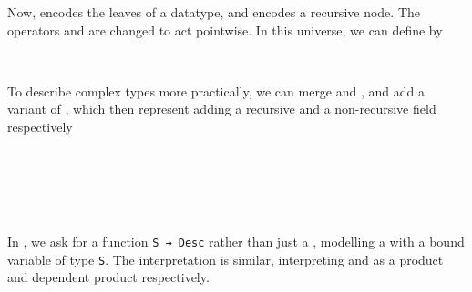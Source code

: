 Now,  encodes the leaves of a datatype, and  encodes a recursive node. The operators  and  are changed to act pointwise. %
In this universe, we can define  by
\begin{code}%
%
\>[2]%
\>[6]\AgdaSymbol{:}\AgdaSpace{}%
\<%
\\
%
\>[2]%
\>[6]\AgdaSymbol{=}\AgdaSpace{}%
\AgdaSpace{}%
\AgdaSpace{}%
\<%
\end{code}
To describe complex types more practically, we can merge  and , and add a variant  of , which then represent adding a recursive and a non-recursive field respectively
\begin{code}[hide]%
\>[0]\AgdaSpace{}%
\AgdaSpace{}%
\<%
\end{code}
\begin{code}%
\>[0][@{}l@{\AgdaIndent{1}}]%
\>[2]\AgdaSpace{}%
\AgdaSpace{}%
\AgdaSymbol{:}\AgdaSpace{}%
\AgdaSpace{}%
\<%
\\
\>[2][@{}l@{\AgdaIndent{0}}]%
\>[4]%
\>[9]\AgdaSymbol{:}\AgdaSpace{}%
\<%
\\
%
\>[4]%
\>[9]\AgdaSymbol{:}\AgdaSpace{}%
\AgdaSpace{}%
\AgdaSpace{}%
\<%
\\
%
\>[4]%
\>[9]\AgdaSymbol{:}\AgdaSpace{}%
\AgdaSymbol{(}\AgdaSpace{}%
\AgdaSymbol{:}\AgdaSpace{}%
\AgdaSymbol{)}\AgdaSpace{}%
\AgdaSpace{}%
\AgdaSymbol{(}\AgdaSpace{}%
\AgdaSpace{}%
\AgdaSymbol{)}\AgdaSpace{}%
\AgdaSpace{}%
\<%
\\
%
\>[4]%
\>[9]\AgdaSymbol{:}\AgdaSpace{}%
\AgdaSpace{}%
\AgdaSpace{}%
\AgdaSpace{}%
\AgdaSpace{}%
\<%
\end{code}
In , we ask for a function \texttt{S → Desc} rather than just a , modelling a  with a bound variable of type \texttt{S}. The interpretation is similar, interpreting  and  as a product and dependent product respectively.

